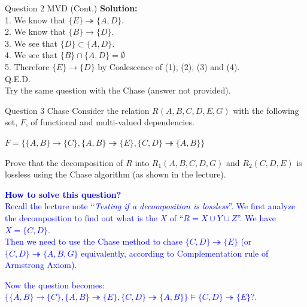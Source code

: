 \begin{frame}[fragile]{Question 2 MVD (Cont.)}
\textbf{Solution:}\\ \vspace{5pt}
1. We know that $\{E\}\twoheadrightarrow\{A,D\}$.\\ \vspace{2pt}
2. We know that $\{B\}\rightarrow\{D\}$.\\\vspace{2pt}
3. We see that $\{D\}\subset\{A,D\}$.\\\vspace{2pt}
4. We see that $\{B\}\cap \{A,D\}=\emptyset$\\\vspace{2pt}
5. Therefore $\{E\}\rightarrow\{D\}$ by Coalescence of (1), (2), (3) and (4).\\\vspace{2pt}
\hfill Q.E.D.\\\vspace{10pt}
Try the same question with the Chase (answer not provided).
\end{frame}

\begin{frame}[fragile]{Question 3 Chase}
Consider the relation $R(A,B,C,D,E,G)$ with the following set, $F$, of functional and multi-valued dependencies.\\ \vspace{5pt}
	
$F=\{\{A,B\}\rightarrow\{C\}, \{A,B\}\twoheadrightarrow\{E\},\{C,D\}\twoheadrightarrow\{A,B\}\}$\\ \vspace{5pt}
	
Prove that the decomposition of $R$ into $R_1(A,B,C,D,G)$ and $R_2(C,D,E)$ is lossless using the Chase algorithm (as shown in the lecture).\\ \vspace{5pt}

\textbf{\textcolor{blue}{How to solve this question?}}\\\vspace{5pt}
\textcolor{blue}{Recall the lecture note ``\emph{Testing if a decomposition is lossless}''.
We first analyze the decomposition to find out what is the $X$ of ``$R=X\cup Y\cup Z$''. We have $X=\{C,D\}$.\\\vspace{2pt}
Then we need to use the Chase method to chase $\{C,D\}\twoheadrightarrow\{E\}$ ({\small or $\{C,D\}\twoheadrightarrow\{A,B,G\}$ equivalently, according to Complementation rule of Armstrong Axiom}).}\\\vspace{5pt}

\textcolor{blue}{Now the question becomes:\\
$\{\{A,B\}\rightarrow\{C\}, \{A,B\}\twoheadrightarrow\{E\},\{C,D\}\twoheadrightarrow\{A,B\}\} \models \{C,D\}\twoheadrightarrow\{E\}$?.}
\end{frame}

